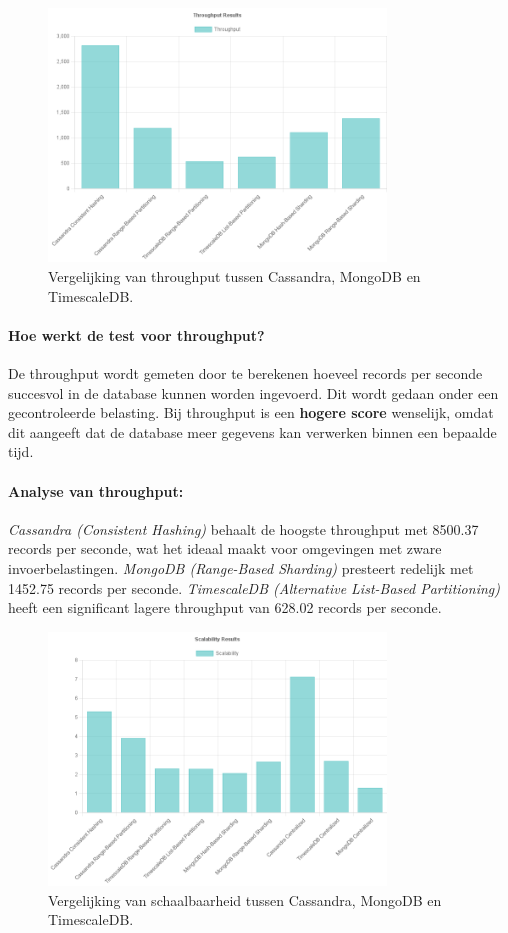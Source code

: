 \begin{figure}[H]
	\centering
	\includegraphics[width=0.8\textwidth]{Throughput.png}
	\caption{Vergelijking van throughput tussen Cassandra, MongoDB en TimescaleDB.}
	\label{fig:throughput-comparison}
\end{figure}

\paragraph{Hoe werkt de test voor throughput?} 
De throughput wordt gemeten door te berekenen hoeveel records per seconde succesvol in de database kunnen worden ingevoerd. Dit wordt gedaan onder een gecontroleerde belasting. Bij throughput is een \textbf{hogere score} wenselijk, omdat dit aangeeft dat de database meer gegevens kan verwerken binnen een bepaalde tijd.

\paragraph{Analyse van throughput:}
\textit{Cassandra (Consistent Hashing)} behaalt de hoogste throughput met 8500.37 records per seconde, wat het ideaal maakt voor omgevingen met zware invoerbelastingen. \textit{MongoDB (Range-Based Sharding)} presteert redelijk met 1452.75 records per seconde. \textit{TimescaleDB (Alternative List-Based Partitioning)} heeft een significant lagere throughput van 628.02 records per seconde.

\begin{figure}[H]
	\centering
	\includegraphics[width=0.8\textwidth]{Scalability.png}
	\caption{Vergelijking van schaalbaarheid tussen Cassandra, MongoDB en TimescaleDB.}
	\label{fig:scalability-comparison}
\end{figure}


